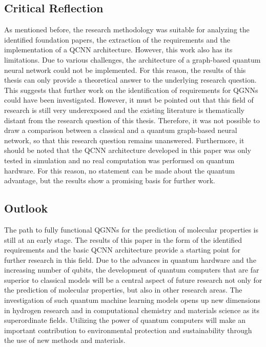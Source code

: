 \subsection{Critical Reflection}
As mentioned before, the research methodology was suitable for analyzing the identified foundation papers, the extraction of the requirements and the implementation of a QCNN architecture. However, this work also has its limitations. Due to various challenges, the architecture of a graph-based quantum neural network could not be implemented. For this reason, the results of this thesis can only provide a theoretical answer to the underlying research question. This suggests that further work on the identification of requirements for QGNNs could have been investigated. However, it must be pointed out that this field of research is still very underexposed and the existing literature is thematically distant from the research question of this thesis. Therefore, it was not possible to draw a comparison between a classical and a quantum graph-based neural network, so that this research question remains unanswered. Furthermore, it should be noted that the QCNN architecture developed in this paper was only tested in simulation and no real computation was performed on quantum hardware. For this reason, no statement can be made about the quantum advantage, but the results show a promising basis for further work.

\subsection{Outlook}
The path to fully functional QGNNs for the prediction of molecular properties is still at an early stage. The results of this paper in the form of the identified requirements and the basic QCNN architecture provide a starting point for further research in this field. Due to the advances in quantum hardware and the increasing number of qubits, the development of quantum computers that are far superior to classical models will be a central aspect of future research not only for the prediction of molecular properties, but also in other research areas. The investigation of such quantum machine learning models opens up new dimensions in hydrogen research and in computational chemistry and materials science as its superordinate fields. Utilizing the power of quantum computers will make an important contribution to environmental protection and sustainability through the use of new methods and materials.